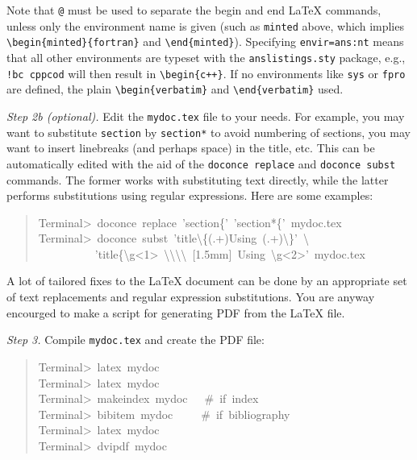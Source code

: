 \documentclass[a4paper]{article}
\begin{document}
Note that \texttt{@} must be used to separate the begin and end
LaTeX commands, unless only the environment name is given (such as
\texttt{minted} above, which implies \texttt{\textbackslash{}begin\{minted\}\{fortran\}} and \texttt{\textbackslash{}end\{minted\}}).
Specifying \texttt{envir=ans:nt} means that all other environments are typeset
with the \texttt{anslistings.sty} package, e.g., \texttt{!bc cppcod} will then
result in \texttt{\textbackslash{}begin\{c++\}}. If no environments like \texttt{sys} or \texttt{fpro} are
defined, the plain \texttt{\textbackslash{}begin\{verbatim\}} and \texttt{\textbackslash{}end\{verbatim\}} used.

\emph{Step 2b (optional).} Edit the \texttt{mydoc.tex} file to your needs.
For example, you may want to substitute \texttt{section} by \texttt{section*} to
avoid numbering of sections, you may want to insert linebreaks
(and perhaps space) in the title, etc. This can be automatically
edited with the aid of the \texttt{doconce replace} and \texttt{doconce subst}
commands. The former works with substituting text directly, while the
latter performs substitutions using regular expressions.
Here are some examples:
%
\begin{quote}{\ttfamily \raggedright \noindent
Terminal>~doconce~replace~'section\{'~'section*\{'~mydoc.tex\\
Terminal>~doconce~subst~'title\textbackslash{}\{(.+)Using~(.+)\textbackslash{}\}'~\textbackslash{}\\
~~~~~~~~~~'title\{\textbackslash{}g<1>~\textbackslash{}\textbackslash{}\textbackslash{}\textbackslash{}~{[}1.5mm{]}~Using~\textbackslash{}g<2>'~mydoc.tex
}
\end{quote}

A lot of tailored fixes to the LaTeX document can be done by
an appropriate set of text replacements and regular expression
substitutions. You are anyway encourged to make a script for
generating PDF from the LaTeX file.

\emph{Step 3.} Compile \texttt{mydoc.tex}
and create the PDF file:
%
\begin{quote}{\ttfamily \raggedright \noindent
Terminal>~latex~mydoc\\
Terminal>~latex~mydoc\\
Terminal>~makeindex~mydoc~~~\#~if~index\\
Terminal>~bibitem~mydoc~~~~~\#~if~bibliography\\
Terminal>~latex~mydoc\\
Terminal>~dvipdf~mydoc
}
\end{quote}
\end{document}
